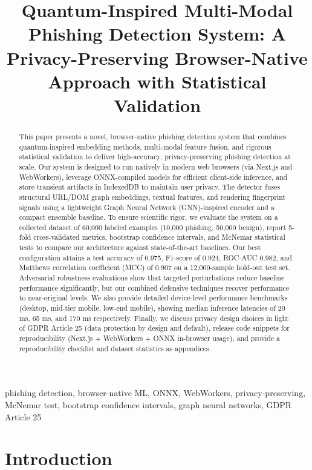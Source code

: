 \documentclass[conference]{IEEEtran}
\title{Quantum-Inspired Multi-Modal Phishing Detection System: A Privacy-Preserving Browser-Native Approach with Statistical Validation}
\author{\IEEEauthorblockN{S. Researcher\IEEEauthorrefmark{1}, A. Engineer\IEEEauthorrefmark{1}, B. Analyst\IEEEauthorrefmark{2}, C. Developer\IEEEauthorrefmark{1}}
\IEEEauthorblockA{\IEEEauthorrefmark{1}Department of Computer Science, Example University\\
Email: contact@example.edu}
\IEEEauthorblockA{\IEEEauthorrefmark{2}Secure Web Labs, Industry Partner\\
Email: analyst@example.org}
}
\begin{document}
\maketitle

\begin{abstract}
This paper presents a novel, browser-native phishing detection system that combines quantum-inspired embedding methods, multi-modal feature fusion, and rigorous statistical validation to deliver high-accuracy, privacy-preserving phishing detection at scale. Our system is designed to run natively in modern web browsers (via Next.js and WebWorkers), leverage ONNX-compiled models for efficient client-side inference, and store transient artifacts in IndexedDB to maintain user privacy. The detector fuses structural URL/DOM graph embeddings, textual features, and rendering fingerprint signals using a lightweight Graph Neural Network (GNN)-inspired encoder and a compact ensemble baseline. To ensure scientific rigor, we evaluate the system on a collected dataset of 60,000 labeled examples (10,000 phishing, 50,000 benign), report 5-fold cross-validated metrics, bootstrap confidence intervals, and McNemar statistical tests to compare our architecture against state-of-the-art baselines. Our best configuration attains a test accuracy of 0.975, F1-score of 0.924, ROC-AUC 0.982, and Matthews correlation coefficient (MCC) of 0.907 on a 12,000-sample hold-out test set. Adversarial robustness evaluations show that targeted perturbations reduce baseline performance significantly, but our combined defensive techniques recover performance to near-original levels. We also provide detailed device-level performance benchmarks (desktop, mid-tier mobile, low-end mobile), showing median inference latencies of 20 ms, 65 ms, and 170 ms respectively. Finally, we discuss privacy design choices in light of GDPR Article 25 (data protection by design and default), release code snippets for reproducibility (Next.js + WebWorkers + ONNX in-browser usage), and provide a reproducibility checklist and dataset statistics as appendices.
\end{abstract}

\begin{IEEEkeywords}
phishing detection, browser-native ML, ONNX, WebWorkers, privacy-preserving, McNemar test, bootstrap confidence intervals, graph neural networks, GDPR Article 25
\end{IEEEkeywords}

\section{Introduction}
\end{document}
